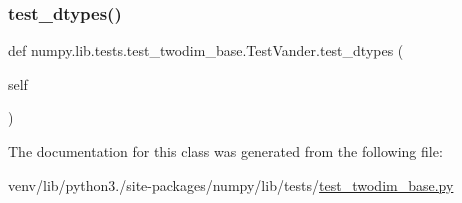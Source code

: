 \mbox{\label{classnumpy_1_1lib_1_1tests_1_1test__twodim__base_1_1TestVander_a9a981a86f0b14349545210baac697a26}} 
\subsubsection{\texorpdfstring{test\+\_\+dtypes()}{test\_dtypes()}}
{\footnotesize\ttfamily def numpy.\+lib.\+tests.\+test\+\_\+twodim\+\_\+base.\+Test\+Vander.\+test\+\_\+dtypes (\begin{DoxyParamCaption}\item[{}]{self }\end{DoxyParamCaption})}



The documentation for this class was generated from the following file\+:\begin{DoxyCompactItemize}
\item 
venv/lib/python3./site-\/packages/numpy/lib/tests/\hyperlink{test__twodim__base_8py}{test\+\_\+twodim\+\_\+base.\+py}\end{DoxyCompactItemize}
